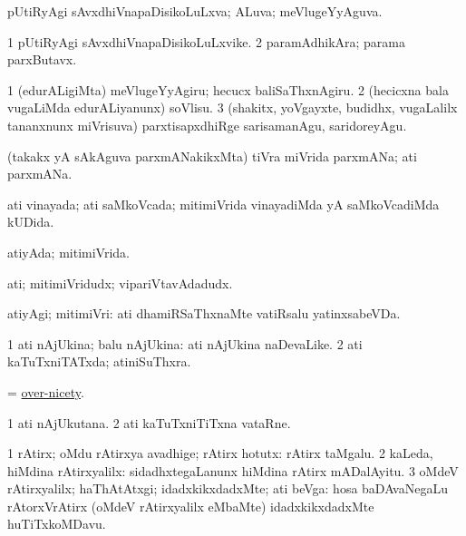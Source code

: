 \bentry
{}
\gl{\gu}
\bmng
pUtiRyAgi sAvxdhiVnapaDisikoLuLxva; ALuva; meVlugeYyAguva. 
\emng
\eentry


\bentry
{}
\gl{\nA}
\bmng
\bnum
\num{1} pUtiRyAgi sAvxdhiVnapaDisikoLuLxvike. 
\num{2} paramAdhikAra; parama parxButavx. 
\enum
\emng
\eentry


\bentry
{}
\gl{\sakirx}
\bmng
\bnum
\num{1} (edurALigiMta) meVlugeYyAgiru; hecucx baliSaThxnAgiru. 
\num{2} (hecicxna bala \mo vugaLiMda edurALiyanunx) soVlisu. 
\num{3} (shakitx, yoVgayxte, budidhx, \mo vugaLalilx tananxnunx miVrisuva) parxtisapxdhiRge sarisamanAgu, saridoreyAgu. 
\enum
\emng
\eentry


\bentry
{}
\gl{\nA}
\bmng
(takakx yA sAkAguva parxmANakikxMta) tiVra miVrida parxmANa; ati parxmANa. 
\emng
\eentry


\bentry
{}
\gl{\gu}
\bmng
ati vinayada; ati saMkoVcada; mitimiVrida vinayadiMda yA saMkoVcadiMda kUDida. 
\emng
\eentry


\bentry
{}
\gl{\gu}
\bmng
atiyAda; mitimiVrida. 
\emng
\eentry


\bentry
{}
\gl{\nA}
\bmng
ati; mitimiVridudx; vipariVtavAdadudx. 
\emng
\eentry


\bentry
{}
\gl{\kirxvi}
\bmng
atiyAgi; mitimiVri:  ati dhamiRSaThxnaMte vatiRsalu yatinxsabeVDa. 
\emng
\eentry


\bentry
{}
\gl{\gu}
\bmng
\bnum
\num{1} ati nAjUkina; balu nAjUkina:  ati nAjUkina naDevaLike. 
\num{2} ati kaTuTxniTATxda; atiniSuThxra. 
\enum
\emng
\eentry


\bentry
{}
\gl{\nA}
\bmng
= \hyperlink{over-nicety}{over-nicety}. 
\emng
\eentry


\bentry
{}
\gl{\nA}
\bmng
\bnum
\num{1} ati nAjUkutana. 
\num{2} ati kaTuTxniTiTxna vataRne. 
\enum
\emng
\eentry


\bentry
{}
\gl{\kirxvi}
\bmng
\bnum
\num{1} rAtirx; oMdu rAtirxya avadhige; rAtirx hotutx:  rAtirx taMgalu. 
\num{2} kaLeda, hiMdina rAtirxyalilx:  sidadhxtegaLanunx hiMdina rAtirx mADalAyitu. 
\num{3} oMdeV rAtirxyalilx; haThAtAtxgi; idadxkikxdadxMte; ati beVga:  hosa baDAvaNegaLu rAtorxVrAtirx (oMdeV rAtirxyalilx eMbaMte) idadxkikxdadxMte huTiTxkoMDavu. 
\enum
\emng
\eentry


